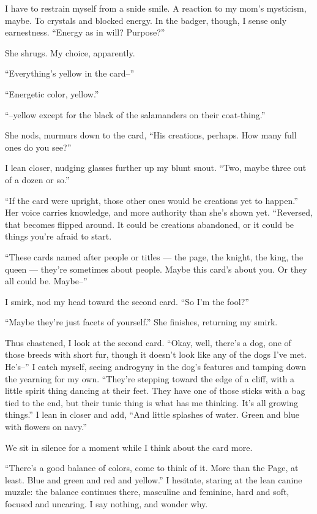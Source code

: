 I have to restrain myself from a snide smile. A reaction to my mom's
mysticism, maybe. To crystals and blocked energy. In the badger, though,
I sense only earnestness. ``Energy as in will? Purpose?''

She shrugs. My choice, apparently.

``Everything's yellow in the card--''

``Energetic color, yellow.''

``--yellow except for the black of the salamanders on their
coat-thing.''

She nods, murmurs down to the card, ``His creations, perhaps. How many
full ones do you see?''

I lean closer, nudging glasses further up my blunt snout. ``Two, maybe
three out of a dozen or so.''

``If the card were upright, those other ones would be creations yet to
happen.'' Her voice carries knowledge, and more authority than she's
shown yet. ``Reversed, that becomes flipped around. It could be
creations abandoned, or it could be things you're afraid to start.

``These cards named after people or titles --- the page, the knight, the
king, the queen --- they're sometimes about people. Maybe this card's
about you. Or they all could be. Maybe--''

I smirk, nod my head toward the second card. ``So I'm the fool?''

``Maybe they're just facets of yourself.'' She finishes, returning my
smirk.

Thus chastened, I look at the second card. ``Okay, well, there's a dog,
one of those breeds with short fur, though it doesn't look like any of
the dogs I've met. He's--'' I catch myself, seeing androgyny in the
dog's features and tamping down the yearning for my own. ``They're
stepping toward the edge of a cliff, with a little spirit thing dancing
at their feet. They have one of those sticks with a bag tied to the end,
but their tunic thing is what has me thinking. It's all growing
things.'' I lean in closer and add, ``And little splashes of water.
Green and blue with flowers on navy.''

We sit in silence for a moment while I think about the card more.

``There's a good balance of colors, come to think of it. More than the
Page, at least. Blue and green and red and yellow.'' I hesitate, staring
at the lean canine muzzle: the balance continues there, masculine and
feminine, hard and soft, focused and uncaring. I say nothing, and wonder
why.

